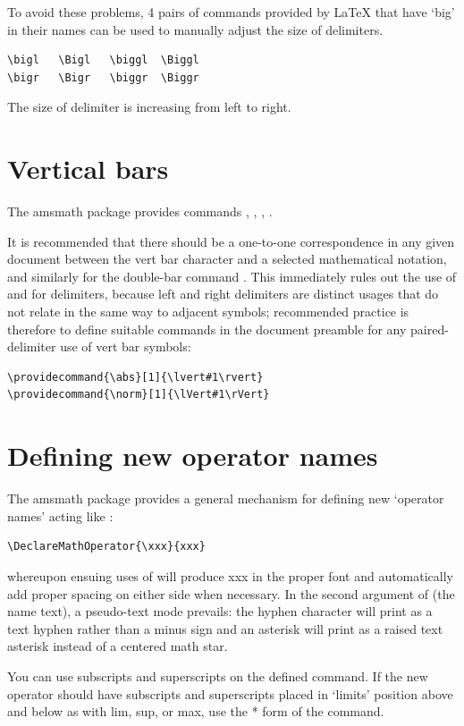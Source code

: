 \documentclass[a4paper,oneside]{book}
\newcommand{\sq}[1]{`#1'}
\newcommand{\package}[1]{\textsf{#1}}
\newcommand{\syntax}[1]{\PVerb{#1}}
\newcommand{\command}[1]{\PVerb{#1}}
\begin{document}
To avoid these problems, 4 pairs of commands provided by \LaTeX{} that have \sq{big} in their names can be used to manually adjust the size of delimiters.
\begin{lstlisting}
\bigl	\Bigl	\biggl	\Biggl
\bigr	\Bigr	\biggr	\Biggr
\end{lstlisting}
The size of delimiter is increasing from left to right.

\section{Vertical bars}
The \package{amsmath} package provides commands \command{\lvert}, \command{\rvert}, \command{\lVert}, \command{\rVert}.

It is recommended that there should be a one-to-one correspondence in any given document between the vert bar character \syntax{|} and a selected mathematical notation, and similarly for the double-bar command \command{\|}. This immediately rules out the use of \syntax{|} and \command{\|} for delimiters, because left and right delimiters are distinct usages that do not relate in the same way to adjacent symbols; recommended practice is therefore to define suitable commands in the document preamble for any paired-delimiter use of vert bar symbols:
\begin{lstlisting}
\providecommand{\abs}[1]{\lvert#1\rvert}
\providecommand{\norm}[1]{\lVert#1\rVert}
\end{lstlisting}

\section{Defining new operator names}
The amsmath package provides a general mechanism for defining new \sq{operator names} acting like \command{\sin}:
\begin{lstlisting}
\DeclareMathOperator{\xxx}{xxx}
\end{lstlisting}
whereupon ensuing uses of \command{\xxx} will produce xxx in the proper font and automatically add proper spacing on either side when necessary.
In the second argument of \command{\DeclareMathOperator} (the name text), a pseudo-text mode prevails: the hyphen character \syntax{-} will print as a text hyphen rather than a minus sign and an asterisk \syntax{*} will print as a raised text asterisk instead of a centered math star.

You can use subscripts and superscripts on the defined command. If the new operator should have subscripts and superscripts placed in \sq{limits} position above and below as with lim, sup, or max, use the * form of the \command{\DeclareMathOperator} command.
\end{document}
